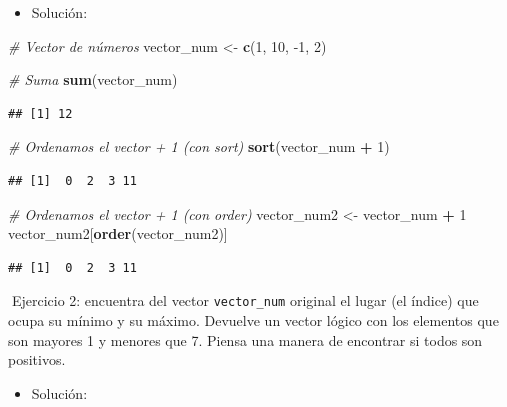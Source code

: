\documentclass[11pt,]{book}
\newenvironment{Shaded}{\begin{snugshade}}{\end{snugshade}}
\newcommand{\CommentTok}[1]{\textcolor[rgb]{0.37,0.37,0.37}{\textit{#1}}}
\newcommand{\DecValTok}[1]{\textcolor[rgb]{0.06,0.06,0.06}{#1}}
\newcommand{\KeywordTok}[1]{\textcolor[rgb]{0.27,0.27,0.27}{\textbf{#1}}}
\newcommand{\NormalTok}[1]{#1}
\newcommand{\OperatorTok}[1]{\textcolor[rgb]{0.43,0.43,0.43}{\textbf{#1}}}
\newcommand{\StringTok}[1]{\textcolor[rgb]{0.5,0.5,0.5}{#1}}
\providecommand{\tightlist}{%
  \setlength{\itemsep}{0pt}\setlength{\parskip}{0pt}}
\begin{document}
\begin{itemize}
\tightlist
\item
  Solución:
\end{itemize}

\begin{Shaded}
\begin{Highlighting}[]
\CommentTok{# Vector de números}
\NormalTok{vector_num <-}\StringTok{ }\KeywordTok{c}\NormalTok{(}\DecValTok{1}\NormalTok{, }\DecValTok{10}\NormalTok{, }\DecValTok{-1}\NormalTok{, }\DecValTok{2}\NormalTok{)}

\CommentTok{# Suma}
\KeywordTok{sum}\NormalTok{(vector_num)}
\end{Highlighting}
\end{Shaded}

\begin{verbatim}
## [1] 12
\end{verbatim}

\begin{Shaded}
\begin{Highlighting}[]
\CommentTok{# Ordenamos el vector + 1 (con sort)}
\KeywordTok{sort}\NormalTok{(vector_num }\OperatorTok{+}\StringTok{ }\DecValTok{1}\NormalTok{)}
\end{Highlighting}
\end{Shaded}

\begin{verbatim}
## [1]  0  2  3 11
\end{verbatim}

\begin{Shaded}
\begin{Highlighting}[]
\CommentTok{# Ordenamos el vector + 1 (con order)}
\NormalTok{vector_num2 <-}\StringTok{ }\NormalTok{vector_num }\OperatorTok{+}\StringTok{ }\DecValTok{1}
\NormalTok{vector_num2[}\KeywordTok{order}\NormalTok{(vector_num2)]}
\end{Highlighting}
\end{Shaded}

\begin{verbatim}
## [1]  0  2  3 11
\end{verbatim}

📝Ejercicio 2: encuentra del vector \texttt{vector\_num} original el lugar (el índice) que ocupa su mínimo y su máximo. Devuelve un vector lógico con los elementos que son mayores 1 y menores que 7. Piensa una manera de encontrar si todos son positivos.

\begin{itemize}
\tightlist
\item
  Solución:
\end{itemize}
\end{document}
